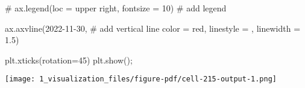 \documentclass[
  letterpaper,
  DIV=11,
  numbers=noendperiod]{scrartcl}
\newenvironment{Shaded}{\begin{snugshade}}{\end{snugshade}}
\newcommand{\CommentTok}[1]{\textcolor[rgb]{0.37,0.37,0.37}{#1}}
\newcommand{\DecValTok}[1]{\textcolor[rgb]{0.68,0.00,0.00}{#1}}
\newcommand{\FloatTok}[1]{\textcolor[rgb]{0.68,0.00,0.00}{#1}}
\newcommand{\NormalTok}[1]{\textcolor[rgb]{0.00,0.23,0.31}{#1}}
\newcommand{\OperatorTok}[1]{\textcolor[rgb]{0.37,0.37,0.37}{#1}}
\newcommand{\StringTok}[1]{\textcolor[rgb]{0.13,0.47,0.30}{#1}}
\begin{document}
\begin{Shaded}
\begin{Highlighting}[]
\CommentTok{\# ax.legend(loc = \textquotesingle{}upper right\textquotesingle{}, fontsize = 10) \# add legend}


\NormalTok{ax.axvline(}\StringTok{\textquotesingle{}2022{-}11{-}30\textquotesingle{}}\NormalTok{, }\CommentTok{\# add vertical line}
\NormalTok{           color }\OperatorTok{=} \StringTok{\textquotesingle{}red\textquotesingle{}}\NormalTok{,}
\NormalTok{           linestyle }\OperatorTok{=} \StringTok{\textquotesingle{}{-}{-}\textquotesingle{}}\NormalTok{,}
\NormalTok{           linewidth }\OperatorTok{=} \FloatTok{1.5}\NormalTok{)}

\NormalTok{plt.xticks(rotation}\OperatorTok{=}\DecValTok{45}\NormalTok{)}
\NormalTok{plt.show()}\OperatorTok{;}
\end{Highlighting}
\end{Shaded}

\texttt{[image: 1\_visualization\_files/figure-pdf/cell-215-output-1.png]}
\end{document}
